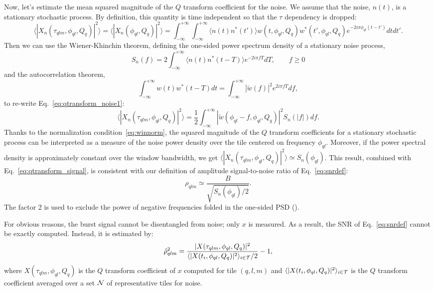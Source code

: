Now, let's estimate the mean squared magnitude of the $Q$ transform coefficient for the noise. We assume that the noise, $n(t)$, is a stationary stochastic process. By definition, this quantity is time independent so that the $\tau$ dependency is dropped:
\begin{equation}
  \langle |X_n(\tau_{qlm}, \phi_{ql}, Q_q)|^2 \rangle = \langle |X_n(\phi_{ql}, Q_q)|^2 \rangle = \int_{-\infty}^{+\infty}{ \int_{-\infty}^{+\infty}{ \langle n(t)n^*(t') \rangle w(t,\phi_{ql},Q_q) w^*(t',\phi_{ql},Q_q) e^{-2i\pi\phi_{ql}(t-t')}dt}dt'}.
  \label{eq:qtransform_noise1}
\end{equation}
Then we can use the Wiener-Khinchin theorem, defining the one-sided power spectrum density of a stationary noise process,
\begin{equation}
  S_n(f)=2\int_{-\infty}^{+\infty}{ \langle n(t)n^*(t-T) \rangle e^{-2i\pi fT}dT},\qquad f\ge0
\end{equation}
and the autocorrelation theorem,
\begin{equation}
  \int_{-\infty}^{+\infty}{w(t)w^*(t-T)dt} = \int_{-\infty}^{+\infty}{|\tilde{w}(f)|^2e^{2i\pi fT}df},
\end{equation}
to re-write Eq.~\ref{eq:qtransform_noise1}:
\begin{equation}
  \langle |X_n(\tau_{qlm}, \phi_{ql}, Q_q)|^2 \rangle =  \frac{1}{2}\int_{-\infty}^{+\infty}{ |\tilde{w}(\phi_{ql}-f,\phi_{ql},Q_q)|^2S_n(|f|) df }.
  \label{eq:qtransform_noise}
\end{equation}
Thanks to the normalization condition~\ref{eq:winnorm}, the squared magnitude of the $Q$ transform coefficients for a stationary stochastic process can be interpreted as a measure of the noise power density over the tile centered on frequency $\phi_{ql}$. Moreover, if the power spectral density is approximately constant over the window bandwidth, we get $\langle |X_n(\tau_{qlm}, \phi_{ql}, Q_q)|^2 \rangle \simeq S_n(\phi_{ql})$. This result, combined with Eq.~\ref{eq:qtransform_signal}, is consistent with our definition of amplitude signal-to-noise ratio of Eq.~\ref{eq:snrdef}:
\begin{equation}
  \rho_{qlm} \simeq  \frac{B}{\sqrt{S_n(\phi_{ql})/2}}.
\end{equation}
The factor 2 is used to exclude the power of negative frequencies folded in the one-sided PSD ().

For obvious reasons, the burst signal cannot be disentangled from noise; only $x$ is measured. As a result, the SNR of Eq.~\ref{eq:snrdef} cannot be exactly computed. Instead, it is estimated by:
\begin{equation}
  \hat{\rho}_{qlm}^2 =  \frac{|X(\tau_{qlm}, \phi_{ql}, Q_q)|^2}{\langle |X(t_i, \phi_{ql}, Q_q)|^2 \rangle_{i\in \cal{T}}/2}-1, \label{eq:snrestimator}
\end{equation}
where $X(\tau_{qlm}, \phi_{ql}, Q_q)$ is the $Q$ transform coefficient of $x$ computed for tile $(q,l,m)$ and $\langle |X(t_i, \phi_{ql}, Q_q)|^2 \rangle_{i\in \cal{T}}$ is the $Q$ transform coefficient averaged over a set $\cal{N}$ of representative tiles for noise.

